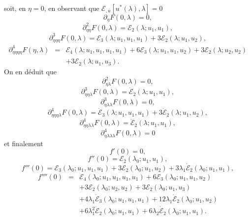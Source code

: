 \documentclass{article}
\begin{document}
soit, en $\eta = 0$, en observant que $ℰ_{, u} [u^{\ast} (λ),
λ] = 0$
\begin{equation} \partial_{\eta} F (0, λ) = 0, \end{equation}
\begin{equation} \partial_{\eta  \eta}^2 F (0, λ) =ℰ_2 (λ ;
   u_1, u_1), \end{equation}
\begin{equation} \partial_{\eta  \eta  \eta}^3 F (0, λ) =ℰ_3
   (λ ; u_1, u_1, u_1) + 3ℰ_2 (λ ; u_1, u_2), \end{equation}
\begin{eqnarray}
  \partial_{\eta  \eta  \eta  \eta}^4 F (\eta,
  λ) & = & ℰ_4 (λ ; u_1, u_1, u_1, u_1) + 6ℰ_3
  (λ ; u_1, u_1, u_2) + 3ℰ_2 (λ ; u_2, u_2) \nonumber\\
  &  &  + 3ℰ_2 (λ ; u_1, u_3) . \nonumber
\end{eqnarray}
On en déduit que
\begin{equation} \partial_{\eta  λ}^2 F (0, λ) = 0, \end{equation}
\begin{equation} \partial_{\eta  \eta  λ}^3 F (0, λ) =
   \dot{ℰ}_2 (λ ; u_1, u_1), \end{equation}
\begin{equation} \partial_{\eta  λ  λ}^3 F (0, λ) = 0, \end{equation}
\begin{equation} \partial_{\eta  \eta  \eta  λ}^4 F (0,
   λ) = \dot{ℰ}_3 (λ ; u_1, u_1, u_1) + 3
   \dot{ℰ}_2 (λ ; u_1, u_2), \text{} \text{} \end{equation}
\begin{equation} \partial_{\eta  \eta  λ  λ}^4 F (0,
   λ) = \ddot{ℰ}_2 (λ ; u_1, u_1), \end{equation}
\begin{equation} \partial_{\eta  λ  λ  λ}^4 F (0,
   λ) = 0 \end{equation}
et finalement
\begin{equation} f' (0) = 0, \end{equation}
\begin{equation} f'' (0) =ℰ_2 (λ_0 ; u_1, u_1), \end{equation}
\begin{equation} f''' (0) =ℰ_3 (λ_0 ; u_1, u_1, u_1) + 3ℰ_2
   (λ_0 ; u_1, u_2) + 3 λ_1  \dot{ℰ}_2 (λ_0 ; u_1,
   u_1), \end{equation}
\begin{eqnarray}
  f'''' (0) & = & ℰ_4 (λ_0 ; u_1, u_1, u_1, u_1) +
  6ℰ_3 (λ_0 ; u_1, u_1, u_2) \nonumber\\
  &  &  + 3ℰ_2 (λ_0 ; u_2, u_2) + 3ℰ_2
  (λ_0 ; u_1, u_3) \nonumber\\
  &  &  + 4 λ_1  \dot{ℰ}_3 (λ_0 ; u_1, u_1,
  u_1) + 12 λ_1  \dot{ℰ}_2 (λ_0 ; u_1, u_2) \nonumber\\
  &  &  + 6 λ_1^2  \ddot{ℰ}_2 (λ_0 ; u_1, u_1)
  + 6 λ_2  \dot{ℰ}_2 (λ_0 ; u_1, u_1) . \nonumber
\end{eqnarray}
\end{document}
